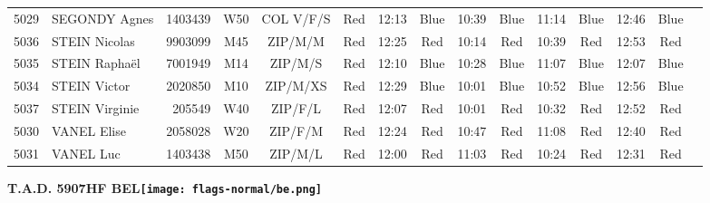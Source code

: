 \documentclass{report}
\begin{document}
\begin{longtable}{|c|l|r|c|c|*{5}{cc|}}
    5029 & SEGONDY Agnes & 1403439 & W50 & COL V/F/S & Red & 12:13 & Blue & 10:39 & Blue & 11:14 & Blue & 12:46 & Blue &  \\
    5036 & STEIN Nicolas & 9903099 & M45 & ZIP/M/M & Red & 12:25 & Red & 10:14 & Red & 10:39 & Red & 12:53 & Red &  \\
    5035 & STEIN Raphaël & 7001949 & M14 & ZIP/M/S & Red & 12:10 & Blue & 10:28 & Blue & 11:07 & Blue & 12:07 & Blue &  \\
    5034 & STEIN Victor & 2020850 & M10 & ZIP/M/XS & Red & 12:29 & Blue & 10:01 & Blue & 10:52 & Blue & 12:56 & Blue &  \\
    5037 & STEIN Virginie & 205549 & W40 & ZIP/F/L & Red & 12:07 & Red & 10:01 & Red & 10:32 & Red & 12:52 & Red &  \\
    5030 & VANEL Elise & 2058028 & W20 & ZIP/F/M & Red & 12:24 & Red & 10:47 & Red & 11:08 & Red & 12:40 & Red &  \\
    5031 & VANEL Luc & 1403438 & M50 & ZIP/M/L & Red & 12:00 & Red & 11:03 & Red & 10:24 & Red & 12:31 & Red &  \\
  \end{longtable}
\newpage
  \Huge \centering \bfseries T.A.D. 5907HF BEL\normalfont \footnotesize \sffamily \hfill \texttt{[image: flags-normal/be.png]} \newline 
\end{document}
